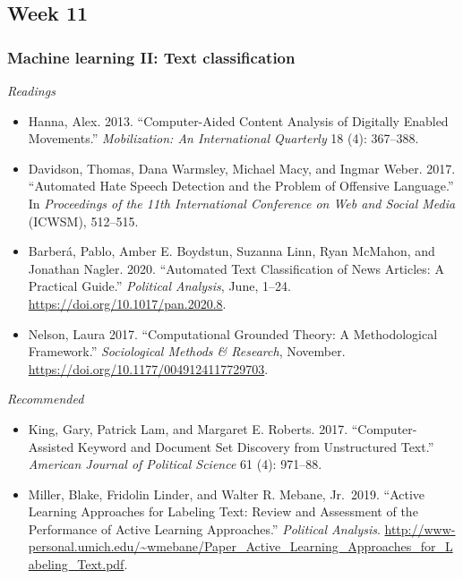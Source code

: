 \documentclass[
  10pt,
]{article}
\providecommand{\tightlist}{%
  \setlength{\itemsep}{0pt}\setlength{\parskip}{0pt}}
\begin{document}
\hypertarget{week-11}{%
\subsection{Week 11}\label{week-11}}

\hypertarget{machine-learning-ii-text-classification}{%
\subsubsection{Machine learning II: Text
classification}\label{machine-learning-ii-text-classification}}

\emph{Readings}

\begin{itemize}
\tightlist
\item
  Hanna, Alex. 2013. ``Computer-Aided Content Analysis of Digitally
  Enabled Movements.'' \emph{Mobilization: An International Quarterly}
  18 (4): 367--388.
\item
  Davidson, Thomas, Dana Warmsley, Michael Macy, and Ingmar Weber. 2017.
  ``Automated Hate Speech Detection and the Problem of Offensive
  Language.'' In \emph{Proceedings of the 11th International Conference
  on Web and Social Media} (ICWSM), 512--515.
\item
  Barberá, Pablo, Amber E. Boydstun, Suzanna Linn, Ryan McMahon, and
  Jonathan Nagler. 2020. ``Automated Text Classification of News
  Articles: A Practical Guide.'' \emph{Political Analysis}, June, 1--24.
  \url{https://doi.org/10.1017/pan.2020.8}.
\item
  Nelson, Laura 2017. ``Computational Grounded Theory: A Methodological
  Framework.'' \emph{Sociological Methods \& Research}, November.
  \url{https://doi.org/10.1177/0049124117729703}.
\end{itemize}

\emph{Recommended}

\begin{itemize}
\tightlist
\item
  King, Gary, Patrick Lam, and Margaret E. Roberts. 2017.
  ``Computer-Assisted Keyword and Document Set Discovery from
  Unstructured Text.'' \emph{American Journal of Political Science} 61
  (4): 971--88.
\item
  Miller, Blake, Fridolin Linder, and Walter R. Mebane, Jr.~2019.
  ``Active Learning Approaches for Labeling Text: Review and Assessment
  of the Performance of Active Learning Approaches.'' \emph{Political
  Analysis}.
  \url{http://www-personal.umich.edu/~wmebane/Paper_Active_Learning_Approaches_for_Labeling_Text.pdf}.
\end{itemize}
\end{document}

